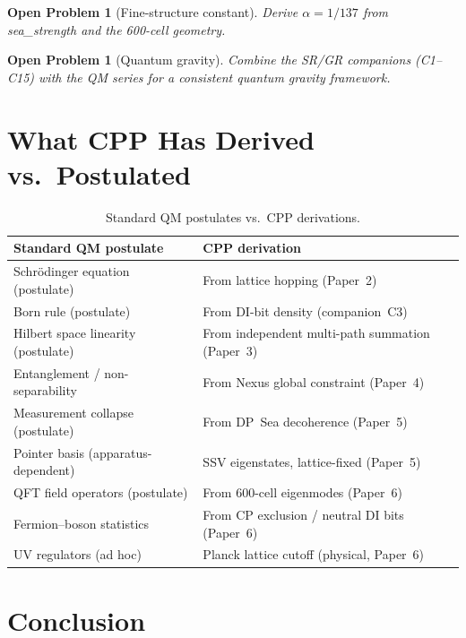 \documentclass[11pt,a4paper]{article}
\newtheorem{openprob}[theorem]{Open Problem}
\begin{document}
\begin{openprob}[Fine-structure constant]
Derive $\alpha = 1/137$ from sea\_strength and the 600-cell geometry.
\end{openprob}

\begin{openprob}[Quantum gravity]
Combine the SR/GR companions (C1--C15) with the QM series for a
consistent quantum gravity framework.
\end{openprob}

\section{What CPP Has Derived vs.\ Postulated}

\begin{table}[H]
\centering
\caption{Standard QM postulates vs.\ CPP derivations.}
\begin{tabular}{@{}p{5.5cm}p{7cm}@{}}
\toprule
Standard QM postulate & CPP derivation \\
\midrule
Schr\"{o}dinger equation (postulate) & From lattice hopping (Paper~2) \\
Born rule (postulate) & From DI-bit density (companion~C3) \\
Hilbert space linearity (postulate) & From independent multi-path summation (Paper~3) \\
Entanglement / non-separability & From Nexus global constraint (Paper~4) \\
Measurement collapse (postulate) & From DP~Sea decoherence (Paper~5) \\
Pointer basis (apparatus-dependent) & SSV eigenstates, lattice-fixed (Paper~5) \\
QFT field operators (postulate) & From 600-cell eigenmodes (Paper~6) \\
Fermion--boson statistics & From CP exclusion / neutral DI bits (Paper~6) \\
UV regulators (ad hoc) & Planck lattice cutoff (physical, Paper~6) \\
\bottomrule
\end{tabular}
\end{table}

\section{Conclusion}
\end{document}
